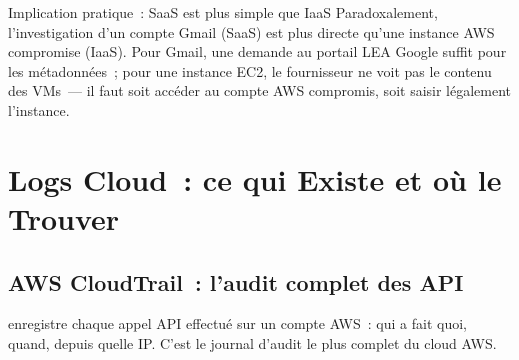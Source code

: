 \begin{boiteRemarque}{Implication pratique~: SaaS est plus simple que IaaS}
Paradoxalement, l'investigation d'un compte Gmail (SaaS) est plus
directe qu'une instance AWS compromise (IaaS). Pour Gmail, une demande
au portail LEA Google suffit pour les métadonnées~; pour une instance
EC2, le fournisseur ne voit pas le contenu des VMs~--- il faut soit
accéder au compte AWS compromis, soit saisir légalement l'instance.
\end{boiteRemarque}

\section{Logs Cloud~: ce qui Existe et où le Trouver}
\label{sec:logs-cloud}

\subsection{AWS CloudTrail~: l'audit complet des API}

 enregistre chaque appel API
effectué sur un compte AWS~: qui a fait quoi, quand, depuis quelle IP.
C'est le journal d'audit le plus complet du cloud AWS.

